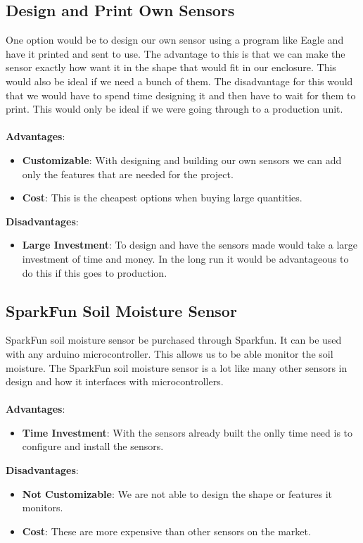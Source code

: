 	\subsection{Design and Print Own Sensors}
	One option would be to design our own sensor using a program like Eagle and
	have it printed and sent to use. The advantage to this is that we can make the
	sensor exactly how want it in the shape that would fit in our enclosure. This
	would also be ideal if we need a bunch of them. The disadvantage for this would
	that we would have to spend time designing it and then have to wait for them
	to print. This would only be ideal if we were going through to a production
	unit.
	\\\\
	\textbf{Advantages}:
	\begin{itemize}
		\item \textbf{Customizable}: With designing and building our own sensors
		we can add only the features that are needed for the project.
		\item \textbf{Cost}: This is the cheapest options when buying large quantities.
	\end{itemize}
	\noindent\textbf{Disadvantages}:
	\begin{itemize}
		\item \textbf{Large Investment}: To design and have the sensors made would
		take a large investment of time and money. In the long run it would be advantageous
		to do this if this goes to production.
	\end{itemize}
	\subsection{SparkFun Soil Moisture Sensor}
	SparkFun soil moisture sensor  be purchased through Sparkfun. It can be used
	with any arduino microcontroller. This allows us to be able monitor the soil
	moisture. The SparkFun soil moisture sensor is a lot like many other sensors
	in design and how it interfaces with microcontrollers.
	\\\\
	\textbf{Advantages}:
	\begin{itemize}
		\item \textbf{Time Investment}: With the sensors already built the onlly time
		need is to configure and install the sensors.
	\end{itemize}
	\noindent\textbf{Disadvantages}:
	\begin{itemize}
		\item \textbf{Not Customizable}: We are not able to design the shape or features
		it monitors.
		\item \textbf{Cost}: These are more expensive than other sensors on the market.
	\end{itemize}
